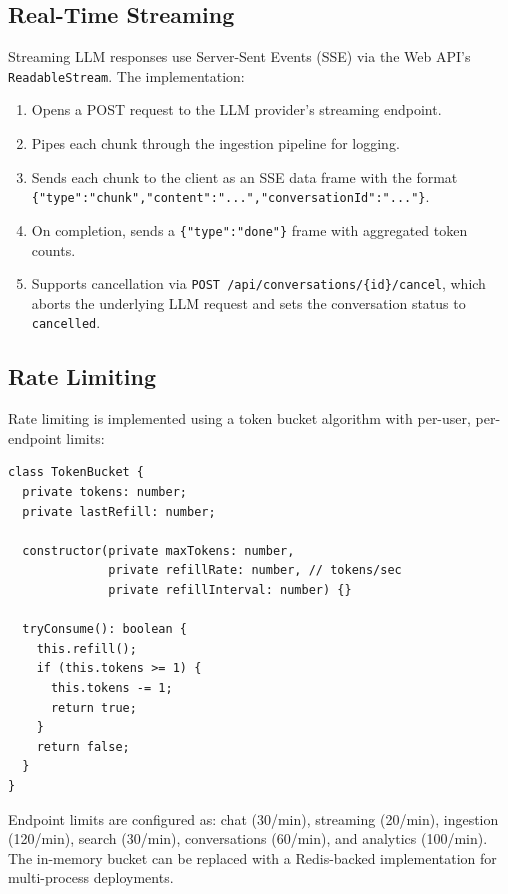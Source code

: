 \documentclass[conference]{IEEEtran}
\begin{document}
\subsection{Real-Time Streaming}

Streaming LLM responses use Server-Sent Events (SSE) via the Web API's \texttt{ReadableStream}. The implementation:

\begin{enumerate}
  \item Opens a POST request to the LLM provider's streaming endpoint.
  \item Pipes each chunk through the ingestion pipeline for logging.
  \item Sends each chunk to the client as an SSE data frame with the format \texttt{\{"type":"chunk","content":"...","conversationId":"..."\}}.
  \item On completion, sends a \texttt{\{"type":"done"\}} frame with aggregated token counts.
  \item Supports cancellation via \texttt{POST /api/conversations/\{id\}/cancel}, which aborts the underlying LLM request and sets the conversation status to \texttt{cancelled}.
\end{enumerate}

\subsection{Rate Limiting}

Rate limiting is implemented using a token bucket algorithm with per-user, per-endpoint limits:

\begin{lstlisting}[caption=Token bucket rate limiter]
class TokenBucket {
  private tokens: number;
  private lastRefill: number;

  constructor(private maxTokens: number,
              private refillRate: number, // tokens/sec
              private refillInterval: number) {}

  tryConsume(): boolean {
    this.refill();
    if (this.tokens >= 1) {
      this.tokens -= 1;
      return true;
    }
    return false;
  }
}
\end{lstlisting}

Endpoint limits are configured as: chat (30/min), streaming (20/min), ingestion (120/min), search (30/min), conversations (60/min), and analytics (100/min). The in-memory bucket can be replaced with a Redis-backed implementation for multi-process deployments.
\end{document}
